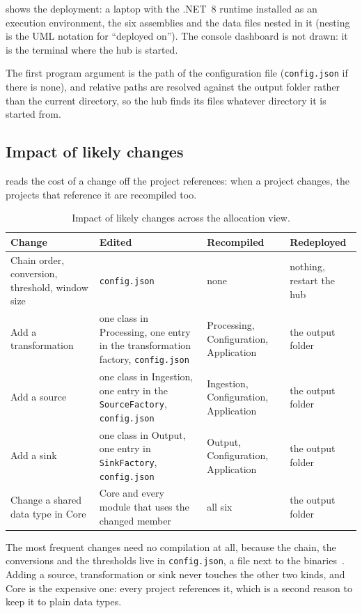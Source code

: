 \documentclass[../main-en.tex]{subfiles}
\begin{document}
 shows the deployment: a laptop with the
.NET~8 runtime installed as an execution environment, the six
assemblies and the data files nested in it (nesting is the UML notation for
``deployed on''). The console dashboard is not drawn: it is the terminal
where the hub is started.


The first program argument is the path of the configuration file
(\texttt{config.json} if there is none), and relative paths are resolved
against the output folder rather than the current directory, so the hub
finds its files whatever directory it is started from.

\subsection{Impact of likely changes}

 reads the cost of a change off the project
references: when a project changes, the projects that reference it are
recompiled too.

\begin{table}[H]
  \centering
  \small
  \caption{Impact of likely changes across the allocation view.}
  \label{tab:allocation-changes}
  \begin{tabularx}{\textwidth}{| L | L | L | L |}
    \hline
    \textbf{Change} & \textbf{Edited} & \textbf{Recompiled} &
    \textbf{Redeployed} \\
    \hline
    Chain order, conversion, threshold, window size & \texttt{config.json} &
    none & nothing, restart the hub \\
    \hline
    Add a transformation & one class in Processing, one entry in the
    transformation factory, \texttt{config.json} & Processing,
    Configuration, Application & the output folder \\
    \hline
    Add a source & one class in Ingestion, one entry in the
    \texttt{SourceFactory}, \texttt{config.json} & Ingestion, Configuration,
    Application & the output folder \\
    \hline
    Add a sink & one class in Output, one entry in \texttt{SinkFactory},
    \texttt{config.json} & Output, Configuration, Application & the output
    folder \\
    \hline
    Change a shared data type in Core & Core and every module that uses the
    changed member & all six & the output folder \\
    \hline
  \end{tabularx}
\end{table}

The most frequent changes need no compilation at all, because the chain, the
conversions and the thresholds live in \texttt{config.json}, a file next to
the binaries~\cite{wiklund_ch8_nodate}. Adding a source, transformation or
sink never touches the other two kinds, and Core is the expensive one: every
project references it, which is a second reason to keep it to plain data
types.
\end{document}
